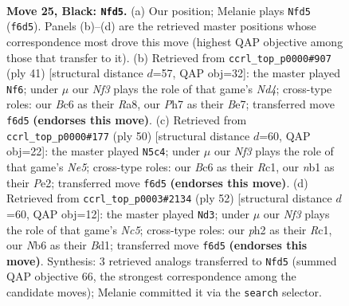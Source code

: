 \documentclass[11pt]{article}
\begin{document}
\clearpage

\begin{figure}[p]\centering
\begin{subfigure}{0.46\textwidth}\centering
\resizebox{\linewidth}{!}{%
\newchessgame
\chessboard[
  setfen={5r1k/4rppp/1nb1pn2/p1N3P1/8/1P2P3/P4RPP/RN1B2K1 b - - 0 25},
  showmover=false,
  pgfstyle=straightmove, color=movearrow, markmove={f6-d5}
]}
\caption{}
\end{subfigure}\hfill
\begin{subfigure}{0.46\textwidth}\centering
\resizebox{\linewidth}{!}{%
\newchessgame
\chessboard[
  setfen={r1r3k1/4bppp/p1p1p3/N2n4/2P5/6B1/PP3PPP/R2R2K1 b - - 0 21},
  showmover=false,
  pgfstyle=straightmove, color=movearrow, markmove={d5-f6}
]}
\caption{}
\end{subfigure}
\\[4pt]
\begin{subfigure}{0.46\textwidth}\centering
\resizebox{\linewidth}{!}{%
\newchessgame
\chessboard[
  setfen={1r1rn1k1/p2p2pp/4pp2/P3N3/1n1P4/4NPP1/1P2P1KP/R1R5 w - - 0 26},
  showmover=false,
  pgfstyle=straightmove, color=movearrow, markmove={e5-c4}
]}
\caption{}
\end{subfigure}\hfill
\begin{subfigure}{0.46\textwidth}\centering
\resizebox{\linewidth}{!}{%
\newchessgame
\chessboard[
  setfen={8/2r2pk1/1np3pp/r1N1p3/p3P2b/2R2P2/PP3PK1/2RB4 w - - 0 27},
  showmover=false,
  pgfstyle=straightmove, color=movearrow, markmove={c5-d3}
]}
\caption{}
\end{subfigure}
\caption{\textbf{Move 25, Black: \texttt{Nfd5}.} (a) Our position; Melanie plays \texttt{Nfd5} (\texttt{f6d5}). Panels (b)--(d) are the retrieved master positions whose correspondence most drove this move (highest QAP objective among those that transfer to it). (b) Retrieved from \texttt{ccrl\_top\_p0000\#907} (ply 41) [structural distance $d$=57, QAP obj=32]: the master played \texttt{Nf6}; under $\mu$ our \emph{Nf3} plays the role of that game's \emph{Nd4}; cross-type roles: our \emph{B}c6 as their \emph{R}a8, our \emph{P}h7 as their \emph{B}e7; transferred move \texttt{f6d5} \textbf{(endorses this move)}. (c) Retrieved from \texttt{ccrl\_top\_p0000\#177} (ply 50) [structural distance $d$=60, QAP obj=22]: the master played \texttt{N5c4}; under $\mu$ our \emph{Nf3} plays the role of that game's \emph{Ne5}; cross-type roles: our \emph{B}c6 as their \emph{R}c1, our \emph{n}b1 as their \emph{P}e2; transferred move \texttt{f6d5} \textbf{(endorses this move)}. (d) Retrieved from \texttt{ccrl\_top\_p0003\#2134} (ply 52) [structural distance $d$=60, QAP obj=12]: the master played \texttt{Nd3}; under $\mu$ our \emph{Nf3} plays the role of that game's \emph{Nc5}; cross-type roles: our \emph{p}h2 as their \emph{R}c1, our \emph{N}b6 as their \emph{B}d1; transferred move \texttt{f6d5} \textbf{(endorses this move)}. Synthesis: 3 retrieved analogs transferred to \texttt{Nfd5} (summed QAP objective 66, the strongest correspondence among the candidate moves); Melanie committed it via the \texttt{search} selector.}
\label{fig:thought-m49}
\end{figure}
\end{document}
